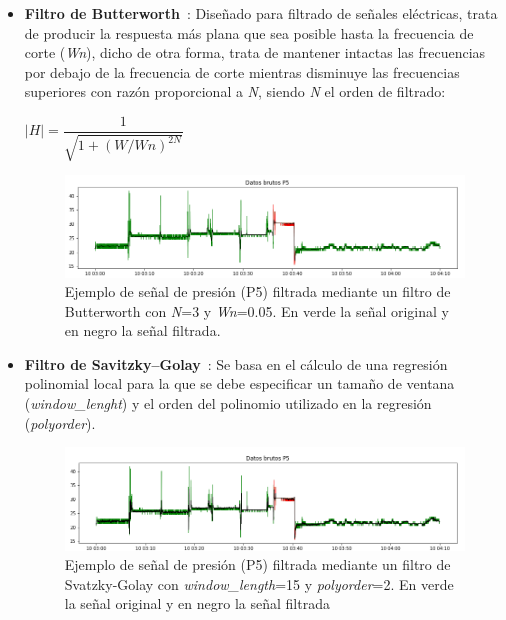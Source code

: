 \begin{itemize}
	\item \textbf{Filtro de Butterworth}~\cite{wiki:butterworth}: Diseñado para filtrado de señales eléctricas, trata de producir la respuesta más plana que sea posible hasta la frecuencia de corte (\textit{Wn}), dicho de otra forma, trata de mantener intactas las frecuencias por debajo de la frecuencia de corte mientras disminuye las frecuencias superiores con razón proporcional a \textit{N}, siendo \textit{N} el orden de filtrado:
	\begin{center}
		$|H| = \dfrac{1}{\sqrt{1+(W/Wn)^{2N}}}$
	\end{center}

	\begin{figure}[H]
		\centering
		\includegraphics[width=1\textwidth]{../img/senalP5butter.png}
		\caption{Ejemplo de señal de presión (P5) filtrada mediante un filtro de Butterworth con \textit{N}=3 y \textit{Wn}=0.05. En verde la señal original y en negro la señal filtrada.}
		\label{fig:senalP5butter}
	\end{figure}
	
	\item \textbf{Filtro de Savitzky–Golay}~\cite{wiki:savitzkygolay}: Se basa en el cálculo de una regresión polinomial local para la que se debe especificar un tamaño de ventana (\textit{window\_lenght}) y el orden del polinomio utilizado en la regresión (\textit{polyorder}). 
	
	\begin{figure}[H]
		\centering
		\includegraphics[width=1\textwidth]{../img/senalP5savgol.png}
		\caption{Ejemplo de señal de presión (P5) filtrada mediante un filtro de Svatzky-Golay con \textit{window\_length}=15 y \textit{polyorder}=2. En verde la señal original y en negro la señal filtrada}
		\label{fig:senalP5savgol}
	\end{figure}
\end{itemize}

